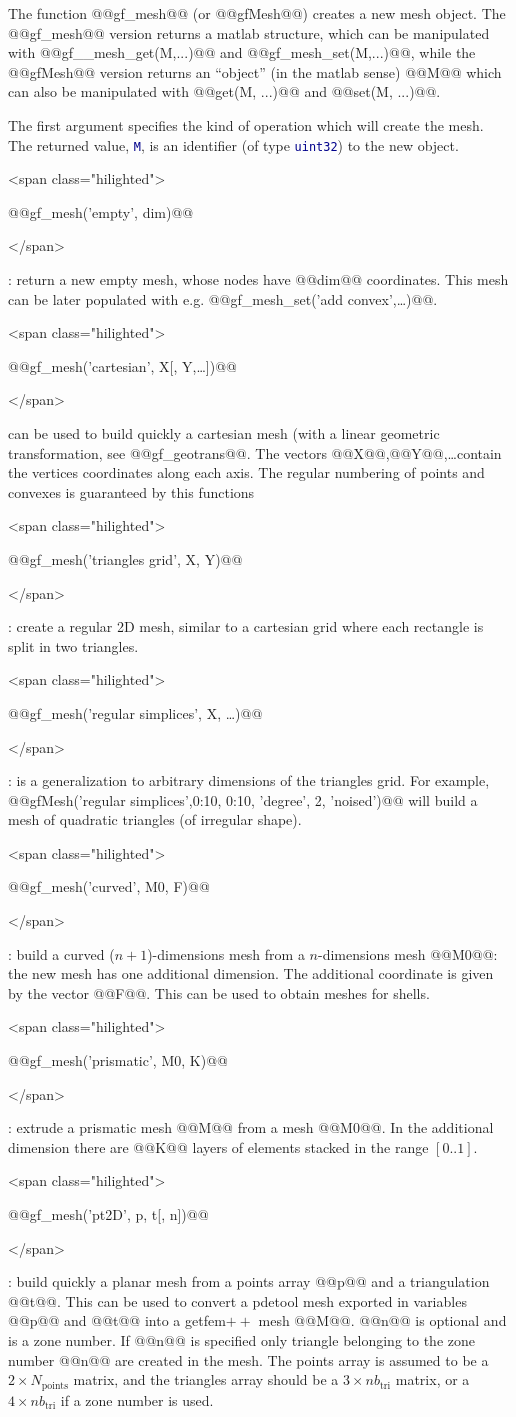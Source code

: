 \documentclass[11pt,a4paper]{article}
\newcommand{\text}[1]{\mathrm{#1}}
\newcommand{\sf}[1]{#1}
\newcommand{\kw}[1]{\textcolor{darkblue}{\texttt{#1}}}
\newcommand{\hil}[1]{\begin{rawxml}<span class="hilighted">\end{rawxml}#1\begin{rawxml}</span>\end{rawxml}}
\newcommand{\sep}[1]{\medskip\par\hil{#1}}
\newcommand{\kw}[1]{\textcolor{darkblue}{\texttt{#1}}}
\newcommand{\hil}[1]{\colorbox{sepbg}{#1}}
\newcommand{\sep}[1]{\medskip\par#1}
\newcommand{\gf}{{\sf getfem${++}$}\xspace}
\begin{document}
\begin{cmddescription}
  The function @@gf\_mesh@@ (or @@gfMesh@@) creates a new mesh object.
  The @@gf\_mesh@@ version returns a matlab structure, which can be
  manipulated with @@gf_\_mesh\_get(M,...)@@ and
  @@gf\_mesh\_set(M,...)@@, while the @@gfMesh@@ version returns an
  ``object'' (in the matlab sense) @@M@@ which can also be manipulated
  with @@get(M, ...)@@ and @@set(M, ...)@@.

  The first argument specifies the kind of operation which will create
  the mesh.  The returned value, \kw{M}, is an identifier (of type
  \kw{uint32}) to the new object.
  
  \sep{@@gf\_mesh('empty', dim)@@} : return a new empty mesh, whose nodes
  have @@dim@@ coordinates. This mesh can be later populated with
  e.g. @@gf\_mesh\_set('add convex',\ldots)@@.
  
  \sep{@@gf\_mesh('cartesian', X[, Y,\ldots])@@}  can be used to build quickly a cartesian
  mesh (with a linear geometric transformation, see @@gf\_geotrans@@. The
  vectors @@X@@,@@Y@@,\ldots contain the vertices coordinates along each axis. The
  regular numbering of points and convexes is guaranteed by this functions
  
  \sep{@@gf\_mesh('triangles grid', X, Y)@@} :  create a regular
  2D mesh, similar to a cartesian grid where each rectangle is split
  in two triangles.

  \sep{@@gf\_mesh('regular simplices', X, \ldots)@@} : is a generalization to
  arbitrary dimensions of the triangles grid. For example,
  @@gfMesh('regular simplices',0:10, 0:10, 'degree', 2, 'noised')@@
  will build a mesh of quadratic triangles (of irregular shape).
  
  \sep{@@gf\_mesh('curved', M0, F)@@} :  build a curved
  ($n+1$)-dimensions mesh from a $n$-dimensions mesh @@M0@@: the
  new mesh has one additional dimension. The additional coordinate is
  given by the vector @@F@@. This can be used to obtain meshes for shells.


  \sep{@@gf\_mesh('prismatic', M0, K)@@} :  
  extrude a prismatic mesh @@M@@ from a mesh @@M0@@. In the additional dimension
  there are @@K@@ layers of elements stacked in the range $[0..1]$.
  
  \sep{@@gf\_mesh('pt2D', p, t[, n])@@} : build quickly a planar mesh from a points
  array @@p@@ and a triangulation @@t@@. This can be used to convert a pdetool
  mesh exported in variables @@p@@ and @@t@@ into a \gf mesh @@M@@.  @@n@@ is
  optional and is a zone number. If @@n@@ is specified only triangle belonging
  to the zone number @@n@@ are created in the mesh. The points array \kw@@p@@ is
  assumed to be a $2\times N_{\text{points}}$ matrix, and the triangles array should
  be a $3\times nb_{\text{tri}}$ matrix, or a $4\times nb_{\text{tri}}$ if a zone number
  is used.
  

\end{cmddescription}
\end{document}
